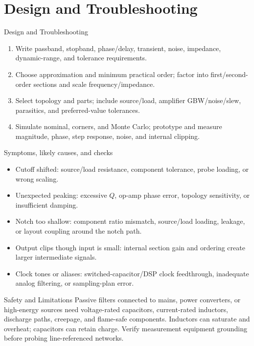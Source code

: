 \documentclass[10pt,letterpaper]{article}
\begin{document}
\section{Design and Troubleshooting}
\begin{CornellExamBox}{Design and Troubleshooting}
\begin{enumerate}
  \item Write passband, stopband, phase/delay, transient, noise, impedance, dynamic-range, and tolerance requirements.
  \item Choose approximation and minimum practical order; factor into first/second-order sections and scale frequency/impedance.
  \item Select topology and parts; include source/load, amplifier GBW/noise/slew, parasitics, and preferred-value tolerances.
  \item Simulate nominal, corners, and Monte Carlo; prototype and measure magnitude, phase, step response, noise, and internal clipping.
\end{enumerate}\end{CornellExamBox}
\begin{CornellExamBox}{Symptoms, likely causes, and checks}
\begin{itemize}
  \item Cutoff shifted: source/load resistance, component tolerance, probe loading, or wrong scaling.
  \item Unexpected peaking: excessive $Q$, op-amp phase error, topology sensitivity, or insufficient damping.
  \item Notch too shallow: component ratio mismatch, source/load loading, leakage, or layout coupling around the notch path.
  \item Output clips though input is small: internal section gain and ordering create larger intermediate signals.
  \item Clock tones or aliases: switched-capacitor/DSP clock feedthrough, inadequate analog filtering, or sampling-plan error.
\end{itemize}\end{CornellExamBox}
\begin{CornellWarningBox}{Safety and Limitations}
Passive filters connected to mains, power converters, or high-energy sources need voltage-rated capacitors, current-rated inductors, discharge paths, creepage, and flame-safe components. Inductors can saturate and overheat; capacitors can retain charge. Verify measurement equipment grounding before probing line-referenced networks.
\end{CornellWarningBox}
\end{document}
